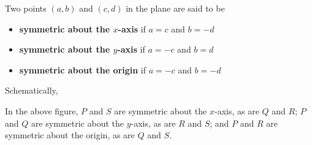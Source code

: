 \documentclass{ximera}
\begin{document}
\begin{definition}

\label{symmetrydefn}

Two points $(a,b)$ and $(c,d)$ in the plane are said to be

\begin{itemize}

\item {} \textbf{symmetric about the \boldmath $x$-axis} if $a = c$ and $b = -d$

\item {} \textbf{symmetric about the \boldmath $y$-axis} if $a = -c$ and $b = d$

\item {} \textbf{symmetric about the origin} if $a = -c$ and $b = -d$

\end{itemize}

\end{definition} 


 

Schematically,

\begin{center}
\end{center}

In the above figure, $P$ and $S$ are symmetric about the $x$-axis, as are $Q$ and $R$;  $P$ and $Q$ are symmetric about the $y$-axis, as are $R$ and $S$;  and $P$ and $R$ are symmetric about the origin, as are $Q$ and $S$.
\end{document}
